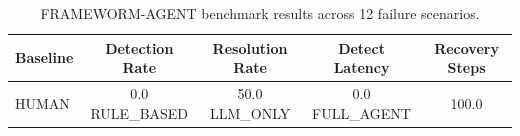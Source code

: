 \begin{table}[h]
\centering
\begin{tabular}{lcccc}
\hline
Baseline & Detection Rate & Resolution Rate & Detect Latency & Recovery Steps \\
\hline
        HUMAN & 0.0%
        RULE_BASED & 50.0%
        LLM_ONLY & 0.0%
        FULL_AGENT & 100.0%
\hline
\end{tabular}
\caption{FRAMEWORM-AGENT benchmark results across 12 failure scenarios.}
\label{tab:benchmark}
\end{table}
